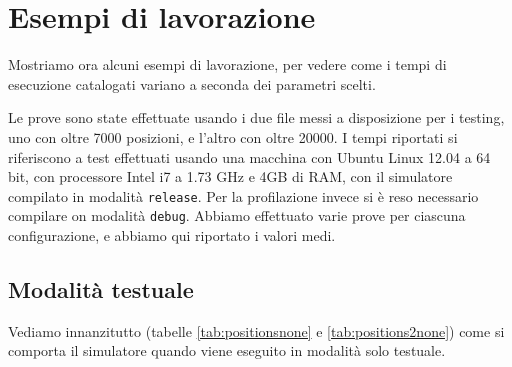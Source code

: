 \section{Esempi di lavorazione}
Mostriamo ora alcuni esempi di lavorazione, per vedere come i tempi di esecuzione catalogati variano a seconda dei parametri scelti.

Le prove sono state effettuate usando i due file messi a disposizione per i testing, uno con oltre 7000 posizioni, e l'altro con oltre 20000. I tempi riportati si riferiscono a test effettuati usando una macchina con Ubuntu Linux 12.04 a 64 bit, con processore Intel i7 a 1.73 GHz e 4GB di RAM, con il simulatore compilato in modalità \verb!release!. Per la profilazione invece si è reso necessario compilare on modalità \verb!debug!. Abbiamo effettuato varie prove per ciascuna configurazione, e abbiamo qui riportato i valori medi.

\subsection{Modalità testuale}
Vediamo innanzitutto (tabelle \ref{tab:positionsnone} e \ref{tab:positions2none}) come si comporta il simulatore quando viene eseguito in modalità solo testuale.

